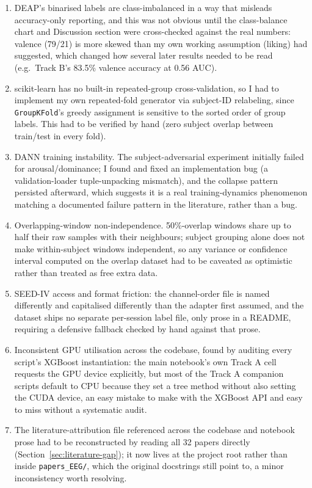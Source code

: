 \documentclass[11pt]{report}
\begin{document}
\begin{enumerate}
  \item DEAP's binarised labels are class-imbalanced in a way that misleads
        accuracy-only reporting, and this was not obvious until the
        class-balance chart and Discussion section were cross-checked
        against the real numbers: valence (79/21) is more skewed than my
        own working assumption (liking) had suggested, which changed how
        several later results needed to be read (e.g.\ Track B's 83.5\%
        valence accuracy at 0.56 AUC).
  \item scikit-learn has no built-in repeated-group cross-validation, so I
        had to implement my own repeated-fold generator via subject-ID
        relabeling, since \texttt{GroupKFold}'s greedy assignment is
        sensitive to the sorted order of group labels. This had to be
        verified by hand (zero subject overlap between train/test in every
        fold).
  \item DANN training instability. The subject-adversarial experiment
        initially failed for arousal/dominance; I found and fixed an
        implementation bug (a validation-loader tuple-unpacking mismatch),
        and the collapse pattern persisted afterward, which suggests it is
        a real training-dynamics phenomenon matching a documented failure
        pattern in the literature, rather than a bug.
  \item Overlapping-window non-independence. 50\%-overlap windows share up
        to half their raw samples with their neighbours; subject grouping
        alone does not make within-subject windows independent, so any
        variance or confidence interval computed on the overlap dataset had
        to be caveated as optimistic rather than treated as free extra data.
  \item SEED-IV access and format friction: the channel-order file is named
        differently and capitalised differently than the adapter first
        assumed, and the dataset ships no separate per-session label file,
        only prose in a README, requiring a defensive fallback checked by
        hand against that prose.
  \item Inconsistent GPU utilisation across the codebase, found by
        auditing every script's XGBoost instantiation: the main notebook's
        own Track A cell requests the GPU device explicitly, but most of
        the Track A companion scripts default to CPU because they set a
        tree method without also setting the CUDA device, an easy mistake
        to make with the XGBoost API and easy to miss without a systematic
        audit.
  \item The literature-attribution file referenced across the codebase and
        notebook prose had to be reconstructed by reading all 32 papers
        directly (Section~\ref{sec:literature-gap}); it now lives at the
        project root rather than inside \texttt{papers\_EEG/}, which the
        original docstrings still point to, a minor inconsistency worth
        resolving.
\end{enumerate}
\end{document}
